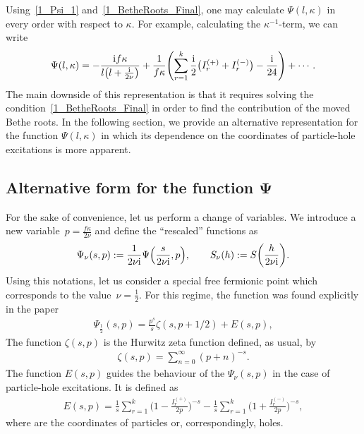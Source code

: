 \documentclass[pdftex]{sigma}
\numberwithin{equation}{section}
\begin{document}
Using~\eqref{1_Psi_1} and~\eqref{1_BetheRoots_Final}, one may calculate $\Psi(l, \kappa)$ in every order with respect to $\kappa$. For example, calculating the $\kappa^{-1}$-term, we can write
\begin{align}\label{1_Psi_Expansion}
\Psi(l, \kappa)=-\frac{{\rm i}f\kappa}{l\bigl(l+\frac{{\rm i}}{2\nu}\bigr)}+\frac{1}{f\kappa}\Biggl(\sum_{r=1}^{k}\frac{{\rm i}}{2}\bigl(I^{(+)}_r+I^{(-)}_r\bigr)-\frac{{\rm i}}{24}\Biggr)+\cdots.
\end{align}
The main downside of this representation is that it requires solving the condition~\eqref{1_BetheRoots_Final} in order to find the contribution of the moved Bethe roots. In the following section, we provide an alternative representation for the function $\Psi(l, \kappa)$ in which its dependence on the coordinates of particle-hole excitations is more apparent.

\subsection[Alternative form for the function Psi]{Alternative form for the function $\boldsymbol{\Psi}$}
For the sake of convenience,  let us perform a change of variables. We introduce a new variable~${p=\frac{f\kappa}{2\nu}}$ and define the ``rescaled'' functions as
\begin{align}
\Psi_\nu(s, p):=\frac{1}{2\nu {\rm i}}\Psi\Bigl(\frac{s}{2\nu {\rm i}}, p\Bigr), \qquad
S_\nu(h):=S\biggl(\frac{h}{2\nu {\rm i}}\biggr).\label{1_Rescale}
\end{align}
Using this notations, let us consider a special free fermionic point which corresponds to the value~${\nu=\frac{1}{2}}$. For this regime, the function  was found explicitly in the paper~\cite{BLZ_2}
\begin{align}\label{1_Psi_BLZ}
\Psi_{\frac{1}{2}}(s, p)=\frac{p^{s}}{s}\zeta\left(s, p+1/2\right)+E(s, p),
\end{align}
The function $\zeta(s, p)$ is the Hurwitz zeta function defined, as usual, by
\begin{align*}
\zeta(s, p)=\sum_{n=0}^{\infty}(p+n)^{-s}.
\end{align*}
The function $E(s, p)$ guides the behaviour of the $\Psi_\nu (s, p)$ in the case of particle-hole excitations. It is defined as
\begin{align*}%
E(s, p)=
 \frac{1}{s} \sum_{r=1}^{k} \biggl(1-\frac{I^{(+)}_r}{2p}\biggr)^{-s}
-\frac{1}{s} \sum_{r=1}^{k} \biggl(1+\frac{I^{(-)}_r}{2p}\biggr)^{-s},
\end{align*}
where  are the coordinates of particles or, correspondingly, holes.
\end{document}
